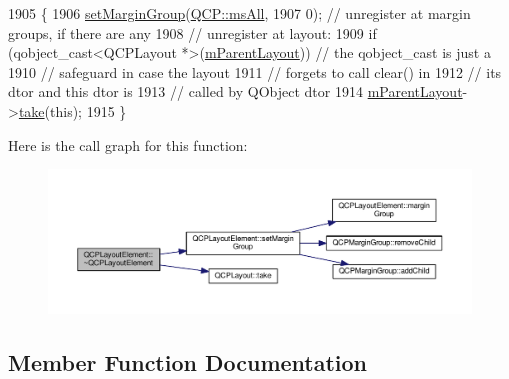 \begin{DoxyCode}
1905                                     \{
1906   \hyperlink{class_q_c_p_layout_element_a516e56f76b6bc100e8e71d329866847d}{setMarginGroup}(\hyperlink{namespace_q_c_p_a7e487e3e2ccb62ab7771065bab7cae54a43d7361cb0c5244eabdc962021bffebc}{QCP::msAll},
1907                  0); \textcolor{comment}{// unregister at margin groups, if there are any}
1908   \textcolor{comment}{// unregister at layout:}
1909   \textcolor{keywordflow}{if} (qobject\_cast<QCPLayout *>(\hyperlink{class_q_c_p_layout_element_ae7c75c25549608bd688bdb65d4c38066}{mParentLayout})) \textcolor{comment}{// the qobject\_cast is just a}
1910                                                 \textcolor{comment}{// safeguard in case the layout}
1911                                                 \textcolor{comment}{// forgets to call clear() in}
1912                                                 \textcolor{comment}{// its dtor and this dtor is}
1913                                                 \textcolor{comment}{// called by QObject dtor}
1914     \hyperlink{class_q_c_p_layout_element_ae7c75c25549608bd688bdb65d4c38066}{mParentLayout}->\hyperlink{class_q_c_p_layout_ada26cd17e56472b0b4d7fbbc96873e4c}{take}(\textcolor{keyword}{this});
1915 \}
\end{DoxyCode}


Here is the call graph for this function\+:\nopagebreak
\begin{figure}[H]
\begin{center}
\leavevmode
\includegraphics[width=350pt]{class_q_c_p_layout_element_a0dc52343920011b3e72d61fc94ed3400_cgraph}
\end{center}
\end{figure}




\subsection{Member Function Documentation}
\hypertarget{class_q_c_p_layout_element_ad6d2b4bb0291c2441b2e1ca3d5296df5}{}
